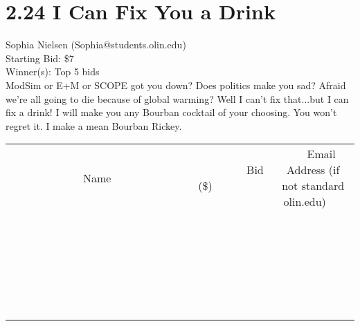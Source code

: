 \documentclass[11pt]{article}
\begin{document}
\section*{2.24 I Can Fix You a Drink}
Sophia Nielsen (Sophia@students.olin.edu) \\
Starting Bid: \$7 \\
Winner(s): 
Top 5 bids \\
ModSim or E+M or SCOPE got you down? Does politics make you sad? Afraid we're all going to die because of global warming? Well I can't fix that...but I can fix a drink! I will make you any Bourban cocktail of your choosing. You won't regret it. I make a mean Bourban Rickey. \\[6ex]
\begin{tabular}{c c c}
~~~~~~~~~~~~~Name~~~~~~~~~~~~~ & ~~~~~~~~~Bid (\$)~~~~~~~~~ & ~~~Email Address (if not standard olin.edu)~~~ \\
 & & \\
\hline
 & & \\
\hline
 & & \\
\hline
 & & \\
\hline
 & & \\
\hline
 & & \\
\hline
 & & \\
\hline
 & & \\
\hline
 & & \\
\hline
 & & \\
\hline
 & & \\
\hline
 & & \\
\hline
 & & \\
\hline
 & & \\
\hline
 & & \\
\hline
 & & \\
\hline
 & & \\
\hline
 & & \\
\hline
 & & \\
\hline
 & & \\
\hline
 & & \\
\hline
 & & \\
\hline
 & & \\
\hline
 & & \\
\hline
 & & \\
\hline
 & & \\
\hline
\end{tabular}
\clearpage
\end{document}
